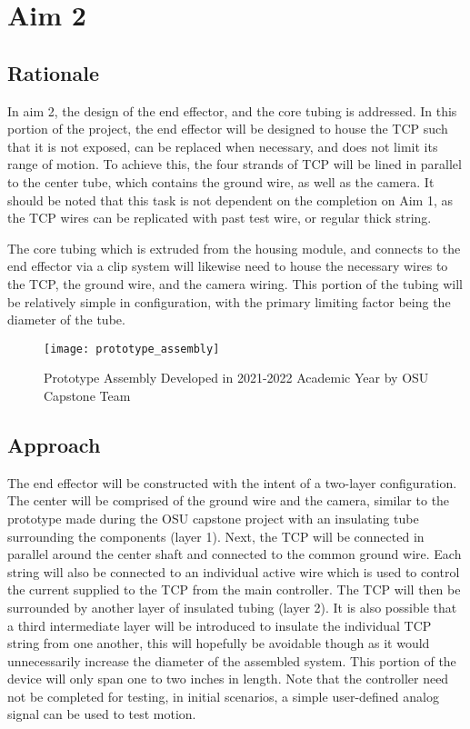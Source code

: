 \section{Aim 2}

\subsection{Rationale}

In aim 2, the design of the end effector, and the core tubing is addressed. In this portion of the project, the end effector will be designed to house the TCP such that it is not exposed, can be replaced when necessary, and does not limit its range of motion. To achieve this, the four strands of TCP will be lined in parallel to the center tube, which contains the ground wire, as well as the camera. It should be noted that this task is not dependent on the completion on Aim 1, as the TCP wires can be replicated with past test wire, or regular thick string.

The core tubing which is extruded from the housing module, and connects to the end effector via a clip system will likewise need to house the necessary wires to the TCP, the ground wire, and the camera wiring. This portion of the tubing will be relatively simple in configuration, with the primary limiting factor being the diameter of the tube.

\begin{figure}[ht]
	\centering
	\texttt{[image: prototype\_assembly]}
	\caption{Prototype Assembly Developed in 2021-2022 Academic Year by OSU Capstone Team}
	\label{fig:prototype_assembly}
\end{figure}

\subsection{Approach}

The end effector will be constructed with the intent of a two-layer configuration. The center will be comprised of the ground wire and the camera, similar to the prototype made during the OSU capstone project with an insulating tube surrounding the components (layer 1). Next, the TCP will be connected in parallel around the center shaft and connected to the common ground wire. Each string will also be connected to an individual active wire which is used to control the current supplied to the TCP from the main controller. The TCP will then be surrounded by another layer of insulated tubing (layer 2). It is also possible that a third intermediate layer will be introduced to insulate the individual TCP string from one another, this will hopefully be avoidable though as it would unnecessarily increase the diameter of the assembled system. This portion of the device will only span one to two inches in length. Note that the controller need not be completed for testing, in initial scenarios, a simple user-defined analog signal can be used to test motion.

